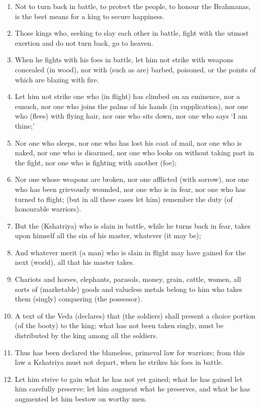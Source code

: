 \begin{enumerate}
\item Not to turn back in battle, to protect the people, to honour the Brahmanas, is the best means for a king to secure happiness.
\item Those kings who, seeking to slay each other in battle, fight with the utmost exertion and do not turn back, go to heaven.
\item When he fights with his foes in battle, let him not strike with weapons concealed (in wood), nor with (such as are) barbed, poisoned, or the points of which are blazing with fire.
\item Let him not strike one who (in flight) has climbed on an eminence, nor a eunuch, nor one who joins the palms of his hands (in supplication), nor one who (flees) with flying hair, nor one who sits down, nor one who says `I am thine;'
\item Nor one who sleeps, nor one who has lost his coat of mail, nor one who is naked, nor one who is disarmed, nor one who looks on without taking part in the fight, nor one who is fighting with another (foe);
\item Nor one whose weapons are broken, nor one afflicted (with sorrow), nor one who has been grievously wounded, nor one who is in fear, nor one who has turned to flight; (but in all these cases let him) remember the duty (of honourable warriors).
\item But the (Kshatriya) who is slain in battle, while he turns back in fear, takes upon himself all the sin of his master, whatever (it may be);
\item And whatever merit (a man) who is slain in flight may have gained for the next (world), all that his master takes.
\item Chariots and horses, elephants, parasols, money, grain, cattle, women, all sorts of (marketable) goods and valueless metals belong to him who takes them (singly) conquering (the possessor).
\item A text of the Veda (declares) that (the soldiers) shall present a choice portion (of the booty) to the king; what has not been taken singly, must be distributed by the king among all the soldiers.
\item Thus has been declared the blameless, primeval law for warriors; from this law a Kshatriya must not depart, when he strikes his foes in battle.
\item Let him strive to gain what he has not yet gained; what he has gained let him carefully preserve; let him augment what he preserves, and what he has augmented let him bestow on worthy men.

\end{enumerate}
